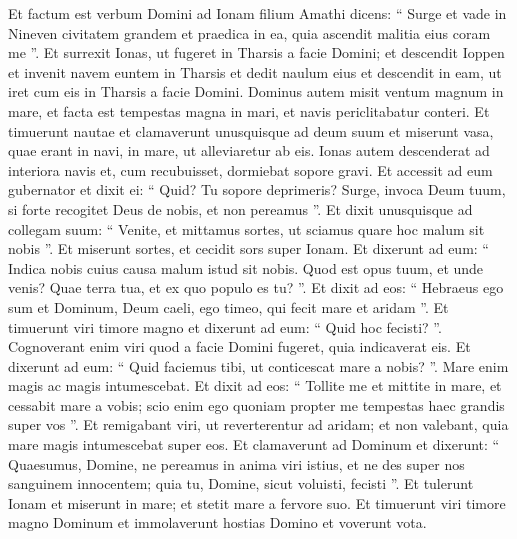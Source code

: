 \begin{biblechapter}
 \verse Et factum est verbum Domini ad Ionam filium Amathi dicens: 
\verse “ Surge et vade in Nineven civitatem grandem et praedica in ea, quia ascendit malitia eius coram me ”. 
\verse Et surrexit Ionas, ut fugeret in Tharsis a facie Domini; et descendit Ioppen et invenit navem euntem in Tharsis et dedit naulum eius et descendit in eam, ut iret cum eis in Tharsis a facie Domini.
 \verse Dominus autem misit ventum magnum in mare, et facta est tempestas magna in mari, et navis periclitabatur conteri. 
\verse Et timuerunt nautae et clamaverunt unusquisque ad deum suum et miserunt vasa, quae erant in navi, in mare, ut alleviaretur ab eis. Ionas autem descenderat ad interiora navis et, cum recubuisset, dormiebat sopore gravi. 
\verse Et accessit ad eum gubernator et dixit ei: “ Quid? Tu sopore deprimeris? Surge, invoca Deum tuum, si forte recogitet Deus de nobis, et non pereamus ”.
 \verse Et dixit unusquisque ad collegam suum: “ Venite, et mittamus sortes, ut sciamus quare hoc malum sit nobis ”. Et miserunt sortes, et cecidit sors super Ionam. 
\verse Et dixerunt ad eum: “ Indica nobis cuius causa malum istud sit nobis. Quod est opus tuum, et unde venis? Quae terra tua, et ex quo populo es tu? ”. 
\verse Et dixit ad eos: “ Hebraeus ego sum et Dominum, Deum caeli, ego timeo, qui fecit mare et aridam ”. 
\verse Et timuerunt viri timore magno et dixerunt ad eum: “ Quid hoc fecisti? ”. Cognoverant enim viri quod a facie Domini fugeret, quia indicaverat eis.
 \verse Et dixerunt ad eum: “ Quid faciemus tibi, ut conticescat mare a nobis? ”. Mare enim magis ac magis intumescebat. 
\verse Et dixit ad eos: “ Tollite me et mittite in mare, et cessabit mare a vobis; scio enim ego quoniam propter me tempestas haec grandis super vos ”.
 \verse Et remigabant viri, ut reverterentur ad aridam; et non valebant, quia mare magis intumescebat super eos. 
\verse Et clamaverunt ad Dominum et dixerunt: “ Quaesumus, Domine, ne pereamus in anima viri istius, et ne des super nos sanguinem innocentem; quia tu, Domine, sicut voluisti, fecisti ”. 
\verse Et tulerunt Ionam et miserunt in mare; et stetit mare a fervore suo. 
\verse Et timuerunt viri timore magno Dominum et immolaverunt hostias Domino et voverunt vota.
 

\end{biblechapter}
